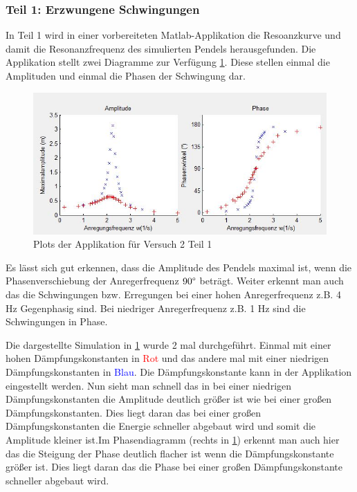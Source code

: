         \subsubsection{Teil 1: Erzwungene Schwingungen}
            
            In Teil 1 wird in einer vorbereiteten Matlab-Applikation die Resoanzkurve und damit die Resonanzfrequenz des simulierten Pendels herausgefunden. Die Applikation stellt zwei Diagramme zur Verfügung \ref{fig:plots_v2}. Diese stellen einmal die Amplituden und einmal die Phasen der Schwingung dar.
            
            \begin{figure}[H]
                \centering
                \includegraphics[width=\textwidth]{bilder/plots_v2.jpg}
                \caption{Plots der Applikation für Versuch 2 Teil 1}
                \label{fig:plots_v2}
            \end{figure}

            Es lässt sich gut erkennen, dass die Amplitude des Pendels maximal ist, wenn die Phasenverschiebung der Anregerfrequenz $90\text{\textdegree}$ beträgt.
            Weiter erkennt man auch das die Schwingungen bzw. Erregungen bei einer hohen Anregerfrequenz z.B. 4 Hz Gegenphasig sind. Bei niedriger Anregerfrequenz z.B. 1 Hz sind die Schwingungen in Phase.
            
            Die dargestellte Simulation in \ref{fig:plots_v2} wurde 2 mal durchgeführt. Einmal mit einer hohen Dämpfungskonstanten in \textcolor{red}{Rot} und das andere mal mit einer niedrigen Dämpfungskonstanten in \textcolor{blue}{Blau}. Die Dämpfungskonstante kann in der Applikation eingestellt werden. Nun sieht man schnell das in bei einer niedrigen Dämpfungskonstanten die Amplitude deutlich größer ist wie bei einer großen Dämpfungskonstanten. Dies liegt daran das bei einer großen Dämpfungskonstanten die Energie schneller abgebaut wird und somit die Amplitude kleiner ist.Im Phasendiagramm (rechts in \ref{fig:plots_v2}) erkennt man auch hier das die Steigung der Phase deutlich flacher ist wenn die Dämpfungskonstante größer ist. Dies liegt daran das die Phase bei einer großen Dämpfungskonstante schneller abgebaut wird.

